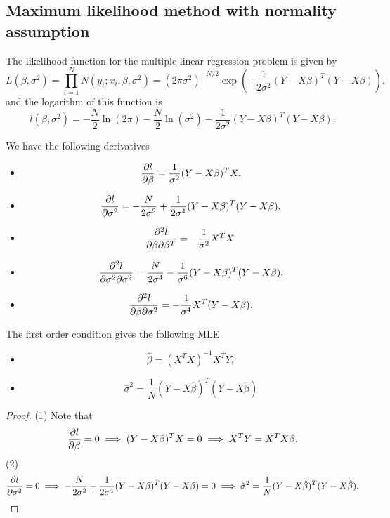 \begin{refsection}
\begin{method}
\begin{itemize}
\end{itemize}

\end{method}



\subsection{Maximum likelihood method with normality assumption}
\begin{theorem}\label{ch:statistical-models:th:maximumLikelihoodMethodLinearRegression}
The likelihood function for the multiple linear regression problem is given by	
	$$L(\beta, \sigma^2) = \prod_{i=1}^{N} N(y_i;x_i,\beta, \sigma^2) = (2\pi\sigma^2)^{-N/2}\exp(-\frac{1}{2\sigma^2}(Y-X\beta)^T(Y-X\beta)),$$
and the logarithm of this function is
$$l(\beta, \sigma^2) = -\frac{N}{2}\ln(2\pi)-\frac{N}{2}\ln(\sigma^2) -\frac{1}{2\sigma^2}(Y-X\beta)^T(Y-X\beta).$$

We have the following derivatives
\begin{itemize}
	\item 
	$$\frac{\partial l}{\partial \beta} = \frac{1}{\sigma^2}(Y-X\beta)^TX.$$
	\item 
	$$\frac{\partial l}{\partial \sigma^2} = -\frac{N}{2\sigma^2} + \frac{1}{2\sigma^4}(Y-X\beta)^T(Y-X\beta).$$
	\item 
	$$\frac{\partial^2 l}{\partial \beta\partial \beta^T} = -\frac{1}{\sigma^2}X^TX.$$
	\item 
	$$\frac{\partial^2 l}{\partial \sigma^2\partial \sigma^2} = \frac{N}{2\sigma^4} -\frac{1}{\sigma^6}(Y-X\beta)^T(Y-X\beta).$$
	\item 
	$$\frac{\partial^2 l}{\partial \beta\partial \sigma^2} = -\frac{1}{\sigma^4}X^T(Y-X\beta).$$
\end{itemize}	

The first order condition gives the following MLE
\begin{itemize}
	\item $$\hat{\beta} = (X^TX)^{-1}X^TY,$$
	\item $$\hat{\sigma}^2 = \frac{1}{N}(Y-X\hat{\beta})^T(Y-X\hat{\beta})$$
\end{itemize}
\end{theorem}
\begin{proof}
(1) Note that 
$$\frac{\partial l}{\partial \beta} = 0\implies (Y-X\beta)^TX = 0\implies X^TY=X^TX\beta.$$
(2)$$\frac{\partial l}{\partial \sigma^2} = 0\implies -\frac{N}{2\sigma^2} + \frac{1}{2\sigma^4}(Y-X\beta)^T(Y-X\beta) = 0\implies \hat{\sigma}^2 = \frac{1}{N}(Y-X\hat{\beta})^T(Y-X\hat{\beta}).$$
\end{proof}


\end{refsection}
